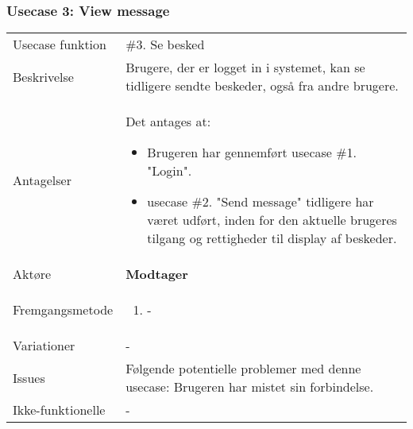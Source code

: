 \subsubsection{Usecase 3: View message \label{Usecase3_View_Message}}
\begin{tabular}{@{}p{3.5cm}@{}p{13cm}@{}}
    Usecase funktion & 
    \#3. Se besked \\
    Beskrivelse & 
    Brugere, der er logget in i systemet, kan se tidligere sendte beskeder, også fra andre brugere. \\
    Antagelser & 
    Det antages at:
    \begin{itemize}
        \item Brugeren har gennemført usecase \#1. "Login".
        \item usecase \#2. "Send message" tidligere har været udført, inden for den aktuelle brugeres tilgang og rettigheder til display af beskeder.
    \end{itemize}\\
    Aktøre & 
    \textbf{Modtager} \\
    Fremgangsmetode &
    \begin{enumerate}
        \item -
    \end{enumerate} \\
    Variationer & 
    - \\
    Issues &
    Følgende potentielle problemer med denne usecase:
    Brugeren har mistet sin forbindelse. \\
    Ikke-funktionelle & 
    -
\end{tabular}
\newpage
